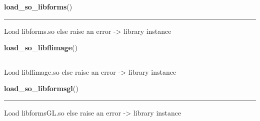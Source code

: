     \label{xformslib:library:load_so_libforms}

    \vspace{0.5ex}

\hspace{.8\funcindent}\begin{boxedminipage}{\funcwidth}

    \raggedright \textbf{load\_so\_libforms}()

    \vspace{-1.5ex}

    \rule{\textwidth}{0.5\fboxrule}
\setlength{\parskip}{2ex}
    Load libforms.so else raise an error -{\textgreater} library instance

\setlength{\parskip}{1ex}
    \end{boxedminipage}

    \label{xformslib:library:load_so_libflimage}

    \vspace{0.5ex}

\hspace{.8\funcindent}\begin{boxedminipage}{\funcwidth}

    \raggedright \textbf{load\_so\_libflimage}()

    \vspace{-1.5ex}

    \rule{\textwidth}{0.5\fboxrule}
\setlength{\parskip}{2ex}
    Load libflimage.so else raise an error -{\textgreater} library instance

\setlength{\parskip}{1ex}
    \end{boxedminipage}

    \label{xformslib:library:load_so_libformsgl}

    \vspace{0.5ex}

\hspace{.8\funcindent}\begin{boxedminipage}{\funcwidth}

    \raggedright \textbf{load\_so\_libformsgl}()

    \vspace{-1.5ex}

    \rule{\textwidth}{0.5\fboxrule}
\setlength{\parskip}{2ex}
    Load libformsGL.so else raise an error -{\textgreater} library instance

\setlength{\parskip}{1ex}
    \end{boxedminipage}

